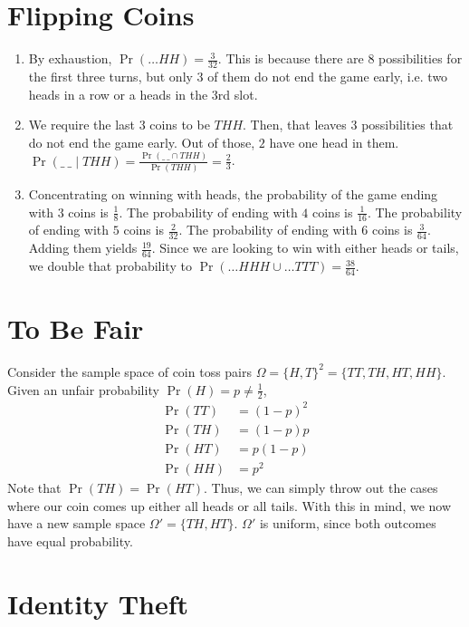 \documentclass{article}
\begin{document}
\section{Flipping Coins}

\begin{enumerate}
    \item By exhaustion, \(\Pr(\ldots HH) = \frac{3}{32}\).
    This is because there are \(8\) possibilities for the first three turns, but only \(3\) of them do not end the game early, i.e. two heads in a row or a heads in the 3rd slot.
    \item We require the last \(3\) coins to be \(THH\).
    Then, that leaves \(3\) possibilities that do not end the game early.
    Out of those, \(2\) have one head in them.
    \(\Pr(\_ \ \_ \mid THH) = \frac{\Pr(\_ \ \_ \cap THH)}{\Pr(THH)} = \frac{2}{3}\).
    \item Concentrating on winning with heads, the probability of the game ending with \(3\) coins is \(\frac{1}{8}\).
    The probability of ending with \(4\) coins is \(\frac{1}{16}\).
    The probability of ending with \(5\) coins is \(\frac{2}{32}\).
    The probability of ending with \(6\) coins is \(\frac{3}{64}\).
    Adding them yields \(\frac{19}{64}\).
    Since we are looking to win with either heads or tails, we double that probability to \(\Pr(\ldots HHH \cup \ldots TTT) = \frac{38}{64}\).
\end{enumerate}

\section{To Be Fair}

Consider the sample space of coin toss pairs \(\Omega = \{H, T\}^2 = \{TT, TH, HT, HH\}\).
Given an unfair probability \(\Pr(H) = p \neq \frac{1}{2}\),
\begin{align}
    \Pr(TT) &= (1 - p)^2 \\
    \Pr(TH) &= (1 - p) p \\
    \Pr(HT) &= p (1 - p) \\
    \Pr(HH) &= p^2
\end{align}
Note that \(\Pr(TH) = \Pr(HT)\).
Thus, we can simply throw out the cases where our coin comes up either all heads or all tails.
With this in mind, we now have a new sample space \(\Omega' = \{TH, HT\}\).
\(\Omega'\) is uniform, since both outcomes have equal probability.

\section{Identity Theft}
\end{document}
